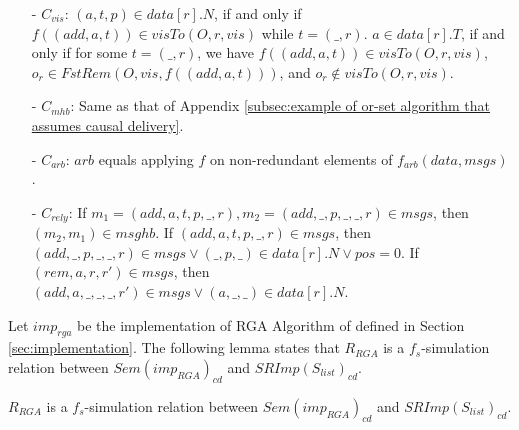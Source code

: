 \begin{itemize}
\item[-] $C_{\mathit{vis}}$: $(a,t,p) \in data[r].N$, if and only if $f((\mathit{add},a,t)) \in \mathit{visTo}(O,r,\mathit{vis})$ while $t = (\_,r)$. $a \in data[r].T$, if and only if for some $t = (\_,r)$, we have $f((\mathit{add},a,t)) \in \mathit{visTo}(O,r,\mathit{vis})$, $o_r \in \mathit{FstRem}(O,\mathit{vis},f((\textit{add},a,t)))$, and $o_r \notin \mathit{visTo}(O,r,\mathit{vis})$.

\item[-] $C_{\mathit{mhb}}$: Same as that of Appendix \ref{subsec:example of or-set algorithm that assumes causal delivery}.

\item[-] $C_{\mathit{arb}}$: $\mathit{arb}$ equals applying $f$ on non-redundant elements of $f_{\mathit{arb}}(\mathit{data},\mathit{msgs})$.

\item[-] $C_{\mathit{rely}}$: If $m_1 = (\mathit{add},a,t,p,\_,r), m_2 = (\mathit{add},\_,p,\_,\_,r) \in \mathit{msgs}$, then $(m_2,m_1) \in \mathit{msghb}$. If $(\mathit{add},a,t,p,\_,r) \in \mathit{msgs}$, then $(\mathit{add},\_,p,\_,\_,r) \in \mathit{msgs} \vee (\_,p,\_) \in \mathit{data}[r].N \vee \mathit{pos}=0$. If $(\mathit{rem},a,r,r') \in \mathit{msgs}$, then $(\mathit{add},a,\_,\_,\_,r') \in \mathit{msgs} \vee (a,\_,\_) \in \mathit{data}[r].N$.
\end{itemize}


Let $\mathit{imp}_{\mathit{rga}}$ be the implementation of RGA Algorithm of \cite{Shapiro:2011} defined in Section \ref{sec:implementation}. The following lemma states that $R_{\mathit{RGA}}$ is a $f_s$-simulation relation between $\mathit{Sem}( \mathit{imp}_{\mathit{RGA}})_{\mathit{cd}}$ and $\mathit{SRImp}(S_{\mathit{list}})_{\mathit{cd}}$. %

\begin{lemma}
\label{lemma:Rrga is a fs simulation between RGA causal delivery algorithm and list specification}
$R_{\mathit{RGA}}$ is a $f_s$-simulation relation between $\mathit{Sem}( \mathit{imp}_{\mathit{RGA}})_{\mathit{cd}}$ and $\mathit{SRImp}(S_{\mathit{list}})_{\mathit{cd}}$.
\end{lemma}

